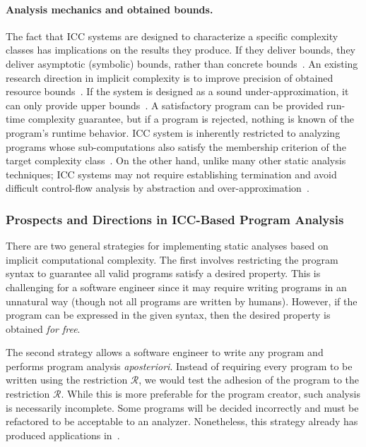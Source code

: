 \paragraph*{Analysis mechanics and obtained bounds.}
The fact that ICC systems are designed to characterize a specific complexity classes has implications on the results they produce.
If they deliver bounds, they deliver asymptotic (symbolic) bounds, rather than concrete bounds~\cite{baillot2019}.
An existing research direction in implicit complexity is to improve precision of obtained resource bounds~\cite{benamram2020}.
If the system is designed as a sound under-approximation, it can only provide upper bounds~\cite[p. 119]{moyen2017}.
A satisfactory program can be provided run-time complexity guarantee,
but if a program is rejected, nothing is known of the program's runtime behavior.
ICC system is inherently restricted to analyzing programs whose sub-computations also satisfy the membership criterion of the target complexity class~\cite{baillot2019}.
On the other hand, unlike many other static analysis techniques;
ICC systems may not require establishing termination and avoid difficult control-flow analysis by abstraction and over-approximation~\cite{jones2009}.

\subsubsection{Prospects and Directions in ICC-Based Program Analysis}

There are two general strategies for implementing static analyses based on implicit computational complexity.
The first involves restricting the program syntax to guarantee all valid programs satisfy a desired property.
This is challenging for a software engineer since it may require writing programs in an unnatural way (though not all programs are written by humans).
However, if the program can be expressed in the given syntax, then the desired property is obtained \emph{for free}.

The second strategy allows a software engineer to write any program and performs program analysis \emph{aposteriori}.
Instead of requiring every program to be written using the restriction \(\mathcal{R}\),
we would test the adhesion of the program to the restriction \(\mathcal{R}\).
While this is more preferable for the program creator, such analysis is necessarily incomplete.
Some programs will be decided incorrectly and must be refactored to be acceptable to an analyzer.
Nonetheless, this strategy already has produced applications in~\textcite{moyen2016,moyen20172}.

